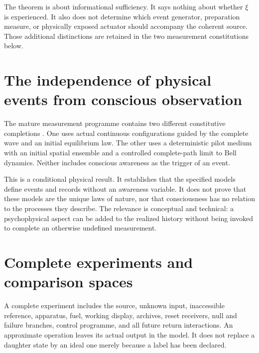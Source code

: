 The theorem is about informational sufficiency. It says nothing about whether $\xi$ is experienced. It also does not determine which event generator, preparation measure, or physically exposed actuator should accompany the coherent source. Those additional distinctions are retained in the two measurement constitutions below.

\section{The independence of physical events from conscious observation}\label{section:quantum:the-independence-of-physical-events-from-conscious-observation}
The mature measurement programme contains two different constitutive completions \cite{RodgersMeasurement,RodgersMassive,RodgersPilot}. One uses actual continuous configurations guided by the complete wave and an initial equilibrium law. The other uses a deterministic pilot medium with an initial spatial ensemble and a controlled complete-path limit to Bell dynamics. Neither includes conscious awareness as the trigger of an event.

This is a conditional physical result. It establishes that the specified models define events and records without an awareness variable. It does not prove that these models are the unique laws of nature, nor that consciousness has no relation to the processes they describe. The relevance is conceptual and technical: a psychophysical aspect can be added to the realized history without being invoked to complete an otherwise undefined measurement.

\section{Complete experiments and comparison spaces}\label{section:quantum:complete-experiments-and-comparison-spaces}
A complete experiment includes the source, unknown input, inaccessible reference, apparatus, fuel, working display, archives, reset receivers, null and failure branches, control programme, and all future return interactions. An approximate operation leaves its actual output in the model. It does not replace a daughter state by an ideal one merely because a label has been declared.

